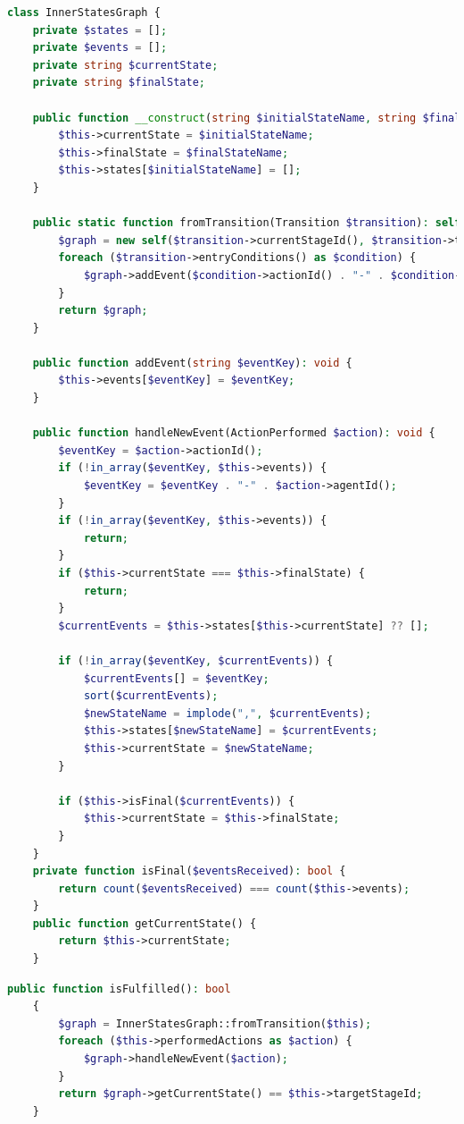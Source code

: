 \begin{lstlisting}[language=php, caption={Class that handles intermediate states.}, basicstyle=\tiny, label=lst:InnerStatesGraph]
class InnerStatesGraph {
    private $states = [];
    private $events = [];
    private string $currentState;
    private string $finalState;

    public function __construct(string $initialStateName, string $finalStateName) {
        $this->currentState = $initialStateName;
        $this->finalState = $finalStateName;
        $this->states[$initialStateName] = [];
    }

    public static function fromTransition(Transition $transition): self {
        $graph = new self($transition->currentStageId(), $transition->targetStageId());
        foreach ($transition->entryConditions() as $condition) {
            $graph->addEvent($condition->actionId() . "-" . $condition->memberId());
        }
        return $graph;
    }

    public function addEvent(string $eventKey): void {
        $this->events[$eventKey] = $eventKey;
    }

    public function handleNewEvent(ActionPerformed $action): void {
        $eventKey = $action->actionId();
        if (!in_array($eventKey, $this->events)) {
            $eventKey = $eventKey . "-" . $action->agentId();
        }
        if (!in_array($eventKey, $this->events)) {
            return;
        }
        if ($this->currentState === $this->finalState) {
            return;
        }
        $currentEvents = $this->states[$this->currentState] ?? [];
        
        if (!in_array($eventKey, $currentEvents)) {
            $currentEvents[] = $eventKey;
            sort($currentEvents);
            $newStateName = implode(",", $currentEvents);
            $this->states[$newStateName] = $currentEvents;
            $this->currentState = $newStateName;
        }

        if ($this->isFinal($currentEvents)) {
            $this->currentState = $this->finalState;
        }
    }
    private function isFinal($eventsReceived): bool {
        return count($eventsReceived) === count($this->events);
    }
    public function getCurrentState() {
        return $this->currentState;
    }
\end{lstlisting}

\begin{lstlisting}[language=php, caption={Transition class isFulfilled method.}, basicstyle=\tiny, label=lst:isFulfilled]
public function isFulfilled(): bool
    {
        $graph = InnerStatesGraph::fromTransition($this);
        foreach ($this->performedActions as $action) {
            $graph->handleNewEvent($action);
        }
        return $graph->getCurrentState() == $this->targetStageId;
    }
\end{lstlisting}


